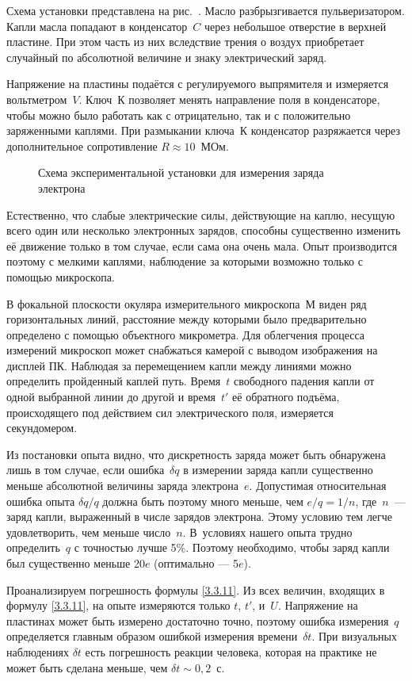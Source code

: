 \experiment Схема установки представлена на рис.~. Масло
разбрызгивается пульверизатором. Капли масла попадают в конденсатор~$C$ через
небольшое отверстие в верхней пластине. При этом часть из них вследствие трения
о воздух приобретает случайный по абсолютной величине и знаку электрический
заряд.

Напряжение на пластины подаётся с регулируемого выпрямителя и измеряется
вольтметром~$V$. Ключ~К позволяет менять направление поля в конденсаторе,
чтобы можно было работать  как с отрицательно, так и с положительно заряженными
каплями. При размыкании ключа~К конденсатор разряжается через дополнительное
сопротивление $R\approx 10$~МОм.
\begin{figure}[h!]
    \centering
	\caption{Схема экспериментальной установки для измерения заряда электрона}
\end{figure}

Естественно, что слабые электрические силы, действующие на каплю, несущую всего
один или несколько электронных зарядов, способны существенно изменить её
движение только в том случае, если сама она очень мала. Опыт производится
поэтому с мелкими каплями, наблюдение за которыми возможно только с помощью
микроскопа.

В фокальной плоскости окуляра измерительного микроскопа~М виден ряд
горизонтальных линий, расстояние между которыми было предварительно определено с
помощью объектного микрометра. Для облегчения процесса измерений микроскоп может
снабжаться камерой с выводом изображения на дисплей ПК. Наблюдая за перемещением
капли между линиями можно определить пройденный каплей путь. Время~$t$
свободного падения капли от одной выбранной линии до другой и время~$t'$ её
обратного подъёма, происходящего под действием сил электрического поля,
измеряется секундомером.

Из постановки опыта видно, что дискретность заряда может быть обнаружена лишь
в том случае, если ошибка~$\delta q$ в измерении заряда капли существенно меньше
абсолютной величины заряда электрона~$e$. Допустимая относительная ошибка опыта
$\delta q/q$ должна быть поэтому много меньше, чем $e/q=1/n$, где~$n$~--- заряд
капли, выраженный в числе зарядов электрона. Этому условию тем легче
удовлетворить, чем меньше число~$n$. 
В~условиях нашего опыта трудно определить~$q$ с точностью лучше 5\%.
Поэтому необходимо, чтобы заряд капли был существенно меньше 20$e$
(оптимально --- 5$e$).

Проанализируем погрешность формулы \eqref{3.3.11}.
Из всех величин, входящих в формулу \eqref{3.3.11}, на опыте измеряются только
$t$, $t'$, и~$U$. Напряжение на пластинах может быть измерено достаточно
точно, поэтому ошибка измерения~$q$ определяется главным образом
ошибкой измерения времени~$\delta t$. При визуальных наблюдениях
$\delta t$ есть погрешность реакции человека, которая на практике не может 
быть сделана меньше, чем $\delta t \sim 0,2$~с.

